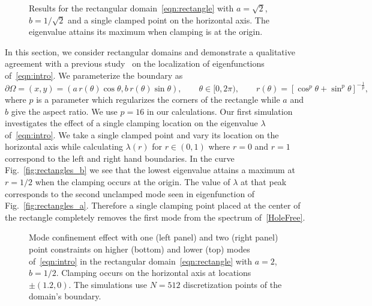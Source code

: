 \documentclass[times]{article}
\begin{document}
\begin{figure}[htbp]
\centering
{}\qquad
{}
\parbox{0.75\textwidth}{\caption{Results for the rectangular
domain~\eqref{eqn:rectangle} with $a=\sqrt{2}$, $b=1/\sqrt{2}$ and a
single clamped point on the horizontal axis. The eigenvalue attains its
maximum when clamping is at the origin.
\label{fig:rectangles}}}
\end{figure}
In this section, we consider rectangular domains and demonstrate a
qualitative agreement with a previous study~\cite{FM} on the
localization of eigenfunctions of~\eqref{eqn:intro}.  We parameterize
the boundary as
\begin{equation}\label{eqn:rectangle}
  \partial\Omega = (x,y) = (a\,r(\theta) \cos\theta, b\,r(\theta) \sin\theta), \qquad
  \theta \in [0,2\pi), \qquad
  r(\theta) = \left[ \cos^{p}\theta  + \sin^{p} \theta \right]^{-\frac{1}{p}},
\end{equation}
where $p$ is a parameter which regularizes the corners of the rectangle
while $a$ and $b$ give the aspect ratio. We use $p=16$ in our
calculations. Our first simulation investigates the effect of a single
clamping location on the eigenvalue $\lambda$ of~\eqref{eqn:intro}.  We
take a single clamped point and vary its location on the horizontal axis
while calculating $\lambda(r)$ for $r\in(0,1)$ where $r=0$ and $r=1$
correspond to the left and right hand boundaries. In the curve
Fig.~\ref{fig:rectangles_b} we see that the lowest eigenvalue attains a
maximum at $r=1/2$ when the clamping occurs at the origin. The value of
$\lambda$ at that peak corresponds to the second unclamped mode seen in
eigenfunction of Fig.~\ref{fig:rectangles_a}. Therefore a single
clamping point placed at the center of the rectangle completely removes
the first mode from the spectrum of~\eqref{HoleFree}.
%
\begin{figure}[htbp]
\centering
{}\qquad
{}
\parbox{0.75\textwidth}{\caption{Mode confinement effect with one (left
panel) and two (right panel) point constraints on higher (bottom) and
lower (top) modes of~\eqref{eqn:intro} in the rectangular
domain~\eqref{eqn:rectangle} with $a=2$, $b= 1/2$. Clamping occurs on
the horizontal axis at locations $\pm(1.2,0)$.  The simulations use
$N=512$ discretization points of the domain's boundary.
\label{fig:ClampedRectangles} }}
\end{figure}
%
\end{document}
